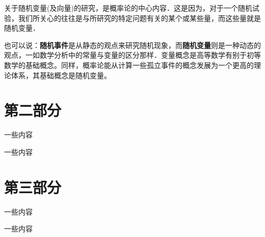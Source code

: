 \documentclass[xcolor=svgnames,serif,table,10pt]{beamer}
\begin{document}
\begin{frame}
	关于随机变量(及向量)的研究，是概率论的中心内容．这是因为，对于一个随机试验，我们所关心的往往是与所研究的特定问题有关的某个或某些量，而这些量就是随机变量．
	
	也可以说：\textbf{随机事件}是从静态的观点来研究随机现象，而\textbf{随机变量}则是一种动态的观点，一如数学分析中的常量与变量的区分那样．变量概念是高等数学有别于初等数学的基础概念。同样，概率论能从计算一些孤立事件的概念发展为一个更高的理论体系，其基础概念是随机变量。
\end{frame}


\section{第二部分}
\begin{frame}
  一些内容
\end{frame}
\begin{frame}
  一些内容
\end{frame}
\section{第三部分}
\begin{frame}
  一些内容
\end{frame}
\begin{frame}
  一些内容
\end{frame}




\begin{frame}[plain]{}
  \begin{center}
  \end{center}
\end{frame}
\end{document}
